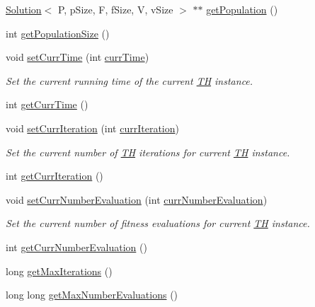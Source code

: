 \begin{DoxyCompactItemize}
\hyperlink{classSolution}{Solution}$<$ P, p\+Size, F, f\+Size, V, v\+Size $>$ $\ast$$\ast$ \hyperlink{structIterationData_af658223157e49b85490c12197f00790f}{get\+Population} ()
\item 
int \hyperlink{structIterationData_aee5bbdc973e57316905ac5ffb0060933}{get\+Population\+Size} ()
\item 
void \hyperlink{structIterationData_ad20713d8a25433c257174f44febda153}{set\+Curr\+Time} (int \hyperlink{structIterationData_ade4c00fea568ba6547b46d39da98ca95}{curr\+Time})
\begin{DoxyCompactList}\small\item\em Set the current running time of the current \hyperlink{classTH}{TH} instance. \end{DoxyCompactList}\item 
int \hyperlink{structIterationData_a4def2a4301f2e4b02d2446b78c8f5d7c}{get\+Curr\+Time} ()
\item 
void \hyperlink{structIterationData_ae3ce80ee3e14d5f99c978821930b33ee}{set\+Curr\+Iteration} (int \hyperlink{structIterationData_a4868b1453ea6cb512ca4b3b91aa9aa46}{curr\+Iteration})
\begin{DoxyCompactList}\small\item\em Set the current number of \hyperlink{classTH}{TH} iterations for current \hyperlink{classTH}{TH} instance. \end{DoxyCompactList}\item 
int \hyperlink{structIterationData_a14d6abc5ad58fadb004cfe11dab40d99}{get\+Curr\+Iteration} ()
\item 
void \hyperlink{structIterationData_acfdb8e5cfb19fb7357ac7ac9850057fe}{set\+Curr\+Number\+Evaluation} (int \hyperlink{structIterationData_a3ebd4afd41be1657a42d79b053896a43}{curr\+Number\+Evaluation})
\begin{DoxyCompactList}\small\item\em Set the current number of fitness evaluations for current \hyperlink{classTH}{TH} instance. \end{DoxyCompactList}\item 
int \hyperlink{structIterationData_ae4b452d760fb10209356cac0de5f695d}{get\+Curr\+Number\+Evaluation} ()
\item 
long \hyperlink{structIterationData_a30c0cc0837d369cd177ee0ded42c6758}{get\+Max\+Iterations} ()
\item 
long long \hyperlink{structIterationData_a689db2058ccd9a558cf9f943ba42b5cc}{get\+Max\+Number\+Evaluations} ()
\item 
$$
\end{DoxyCompactItemize}
